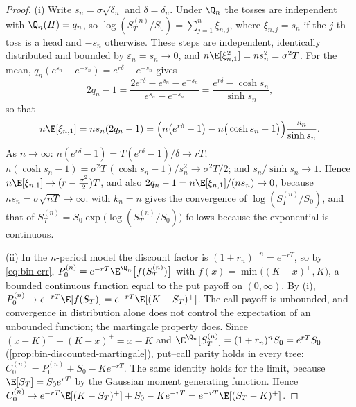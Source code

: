 \begin{proof}
(i) Write $s_n=\sigma\sqrt{\delta_n}$ and $\delta=\delta_n$. Under $\Q_n$ the tosses are
independent with $\Q_n(H)=q_n$, so $\log(S^{(n)}_T/S_0)=\sum_{j=1}^n\xi_{n,j}$, where
$\xi_{n,j}=s_n$ if the $j$-th toss is a head and $-s_n$ otherwise. These steps are
independent, identically distributed and bounded by $\varepsilon_n=s_n\to0$, and
$n\E[\xi_{n,1}^2]=ns_n^2=\sigma^2T$. For the mean, $q_n(e^{s_n}-e^{-s_n})=e^{r\delta}-e^{-s_n}$
gives
\[
  2q_n-1=\frac{2e^{r\delta}-e^{s_n}-e^{-s_n}}{e^{s_n}-e^{-s_n}}=\frac{e^{r\delta}-\cosh s_n}{\sinh s_n},
\]
so that
\[
  n\E[\xi_{n,1}]=ns_n(2q_n-1)=\Big(n\big(e^{r\delta}-1\big)-n\big(\cosh s_n-1\big)\Big)\frac{s_n}{\sinh s_n}.
\]
As $n\to\infty$: $n(e^{r\delta}-1)=T(e^{r\delta}-1)/\delta\to rT$;
$n(\cosh s_n-1)=\sigma^2T\,(\cosh s_n-1)/s_n^2\to\sigma^2T/2$; and $s_n/\sinh s_n\to1$. Hence
$n\E[\xi_{n,1}]\to(r-\frac{\sigma^2}{2})T$, and also $2q_n-1=n\E[\xi_{n,1}]/(ns_n)\to0$,
because $ns_n=\sigma\sqrt{nT}\to\infty$.  with $k_n=n$ gives the convergence
of $\log(S^{(n)}_T/S_0)$, and that of $S^{(n)}_T=S_0\exp\big(\log(S^{(n)}_T/S_0)\big)$
follows because the exponential is continuous.

(ii) In the $n$-period model the discount factor is $(1+r_n)^{-n}=e^{-rT}$, so by
\eqref{eq:bin-crr}, $P^{(n)}_0=e^{-rT}\E^{\Q_n}\big[f(S^{(n)}_T)\big]$ with
$f(x)=\min\big((K-x)^+,K\big)$, a bounded continuous function equal to the put payoff on
$(0,\infty)$. By (i), $P^{(n)}_0\to e^{-rT}\E[f(S_T)]=e^{-rT}\E[(K-S_T)^+]$. The call payoff is
unbounded, and convergence in distribution alone does not control the expectation of an
unbounded function; the martingale property does. Since $(x-K)^+-(K-x)^+=x-K$ and
$\E^{\Q_n}[S^{(n)}_T]=(1+r_n)^nS_0=e^{rT}S_0$ (\cref{prop:bin-discounted-martingale}), put--call
parity holds in every tree: $C^{(n)}_0=P^{(n)}_0+S_0-Ke^{-rT}$. The same identity holds for
the limit, because $\E[S_T]=S_0e^{rT}$ by the Gaussian moment generating function. Hence
$C^{(n)}_0\to e^{-rT}\E[(K-S_T)^+]+S_0-Ke^{-rT}=e^{-rT}\E[(S_T-K)^+]$.
\end{proof}

